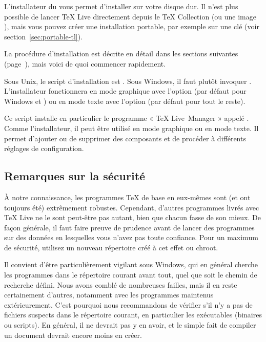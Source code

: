\documentclass[german, english, french]{article}
\renewcommand{\TL}{\TeX{} Live\xspace}%
\renewcommand{\TK}{\TeX{} Collection\xspace}%
\def\p.{page~}
\begin{document}
L'installateur du \DVD vous permet d'installer sur votre disque dur. Il n'est
plus possible de lancer \TL{} directement depuis le \DVD{} \TK{} (ou une image
), mais vous pouvez créer une installation portable, par exemple sur
une clé \USB{} (voir section~\ref{sec:portable-tl}).

La procédure d'installation est décrite en détail dans les sections suivantes
(\p.\pageref{sec:install}), mais voici de quoi commencer rapidement.

\begin{itemize*}

\item Sous Unix, le script d'installation est .  Sous
  Windows, il faut plutôt invoquer .
  L'installateur fonctionnera en mode graphique avec l'option 
  (par défaut pour Windows et \MacOSX) ou en mode texte avec l'option
   (par défaut pour tout le reste).

\item Ce script installe en particulier le programme « \TL\ Manager » appelé
  . Comme l'installateur, il peut être utilisé en mode graphique ou
  en mode texte. Il permet d'ajouter ou de supprimer des composants et de
  procéder à différents réglages de configuration.

\end{itemize*}

\subsection{Remarques sur la sécurité}
\label{sec:security}

À notre connaissance, les programmes \TeX{} de base en eux-mêmes sont (et ont
toujours été) extrêmement robustes. Cependant, d'autres programmes livrés avec
\TL{} ne le sont peut-être pas autant, bien que chacun fasse de son mieux. De
façon générale, il faut faire preuve de prudence avant de lancer des programmes
sur des données en lesquelles vous n'avez pas toute confiance. Pour un maximum
de sécurité, utilisez un nouveau répertoire créé à cet effet ou chroot.

Il convient d'être particulièrement vigilant sous Windows, qui en général
cherche les programmes dans le répertoire courant avant tout, quel que soit le
chemin de recherche défini. Nous avons comblé de nombreuses failles, mais il en
reste certainement d'autres, notamment avec les programmes maintenus
extérieurement. C'est pourquoi nous recommandons de vérifier s'il n'y a pas de
fichiers suspects dans le répertoire courant, en particulier les exécutables
(binaires ou scripts). En général, il ne devrait pas y en avoir, et le simple
fait de compiler un document devrait encore moins en créer.
\end{document}

